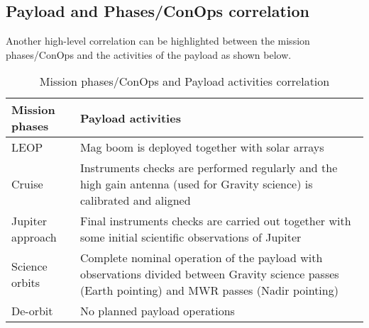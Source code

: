 \subsection{Payload and Phases/ConOps correlation}
Another high-level correlation can be highlighted between the mission phases/ConOps and the activities of the payload as shown below. %


\begin{table}[H]
    \renewcommand{\arraystretch}{1.5}
    \centering
    \begin{tabularx}{\linewidth}{|X|X|}
        \hline
        \textbf{Mission phases} & \textbf{Payload activities} \\
        \hline
        \hline
        LEOP & Mag boom is deployed together with solar arrays \\
        \hline
        Cruise & Instruments checks are performed regularly and the high gain antenna (used for Gravity science) is calibrated and aligned \\
        \hline
        Jupiter approach & Final instruments checks are carried out together with some initial scientific observations of Jupiter \\
        \hline
        Science orbits & Complete nominal operation of the payload with observations divided between Gravity science passes (Earth pointing) and MWR passes (Nadir pointing) \\
        \hline
        De-orbit & No planned payload operations \\
        \hline
    \end{tabularx}
    \caption{Mission phases/ConOps and Payload activities correlation}
\end{table}